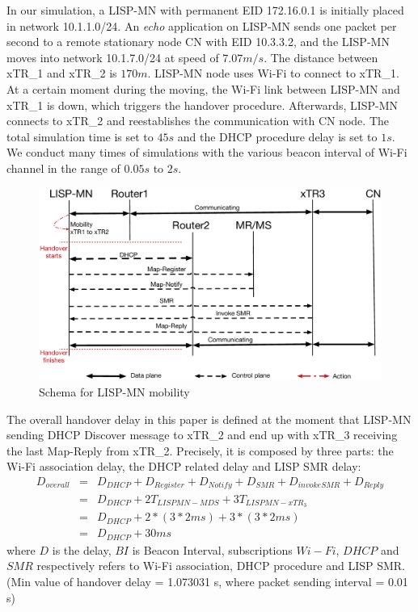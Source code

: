 In our simulation, a LISP-MN with permanent EID 172.16.0.1 is initially placed in network 10.1.1.0/24. An \emph{echo} application on LISP-MN sends one packet per second to a remote stationary node CN with EID 10.3.3.2, and the LISP-MN moves into network 10.1.7.0/24 at speed of $7.07m/s$. The distance between xTR\_1 and xTR\_2 is $170m$. LISP-MN node uses Wi-Fi to connect to xTR\_1. At a certain moment during the moving, the Wi-Fi link between LISP-MN and xTR\_1 is down, which triggers the handover procedure. Afterwards, LISP-MN connects to xTR\_2 and reestablishes the communication with CN node. The total simulation time is set to $45s$ and the DHCP procedure delay is set to $1s$. We conduct many times of simulations with the various beacon interval of Wi-Fi channel in the range of $0.05s$ to $2s$.

\begin{figure}[!th]
	\centering
	\includegraphics[width=\textwidth]{Pics/Mobility_LISPMN_schema_SMR_simplify}
	\caption{Schema for LISP-MN mobility}
	\label{sim_schema}
\end{figure}

The overall handover delay in this paper is defined at the moment that LISP-MN sending DHCP Discover message to xTR\_2 and end up with xTR\_3 receiving the last Map-Reply from xTR\_2. Precisely, it is composed by three parts: the Wi-Fi association delay, the DHCP related delay and LISP SMR delay:
\begin{eqnarray}
D_{overall} &=& D_{DHCP} + D_{Register} + D_{Notify} + D_{SMR} + D_{invokeSMR} + D_{Reply} \nonumber \\
&=& D_{DHCP} + 2T_{LISPMN-MDS} + 3T_{LISPMN-xTR_3} \nonumber \\
&=& D_{DHCP} + 2* (3*2ms) + 3*(3*2ms)\nonumber \\
&=& D_{DHCP} + 30 ms
\end{eqnarray}
where $D$ is the delay, $BI$ is Beacon Interval, subscriptions $Wi-Fi$, $DHCP$ and $SMR$ respectively refers to Wi-Fi association, DHCP procedure and LISP SMR. (Min value of handover delay = 1.073031 s, where packet sending interval = 0.01 s) 


